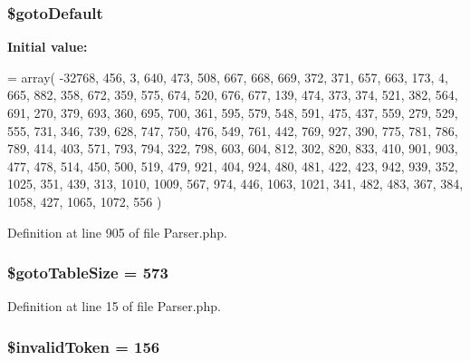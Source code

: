\subsubsection[{\$goto\+Default}]{\setlength{\rightskip}{0pt plus 5cm}\$goto\+Default\hspace{0.3cm}{\ttfamily [protected]}}\label{class_php_parser_1_1_parser_acc0e9d56033200d3981ea79b079da45d}
{\bfseries Initial value\+:}
\begin{DoxyCode}
= array(
        -32768,  456,    3,  640,  473,  508,  667,  668,  669,  372,
          371,  657,  663,  173,    4,  665,  882,  358,  672,  359,
          575,  674,  520,  676,  677,  139,  474,  373,  374,  521,
          382,  564,  691,  270,  379,  693,  360,  695,  700,  361,
          595,  579,  548,  591,  475,  437,  559,  279,  529,  555,
          731,  346,  739,  628,  747,  750,  476,  549,  761,  442,
          769,  927,  390,  775,  781,  786,  789,  414,  403,  571,
          793,  794,  322,  798,  603,  604,  812,  302,  820,  833,
          410,  901,  903,  477,  478,  514,  450,  500,  519,  479,
          921,  404,  924,  480,  481,  422,  423,  942,  939,  352,
         1025,  351,  439,  313, 1010, 1009,  567,  974,  446, 1063,
         1021,  341,  482,  483,  367,  384, 1058,  427, 1065, 1072,
          556
    )
\end{DoxyCode}


Definition at line 905 of file Parser.\+php.

\subsubsection[{\$goto\+Table\+Size}]{\setlength{\rightskip}{0pt plus 5cm}\$goto\+Table\+Size = 573\hspace{0.3cm}{\ttfamily [protected]}}\label{class_php_parser_1_1_parser_ae23bb25a2f8c39bb0503c60d46d83fca}


Definition at line 15 of file Parser.\+php.

\subsubsection[{\$invalid\+Token}]{\setlength{\rightskip}{0pt plus 5cm}\$invalid\+Token = 156\hspace{0.3cm}{\ttfamily [protected]}}\label{class_php_parser_1_1_parser_a9915dd96f16d519a9541fb2a70bc0a37}


